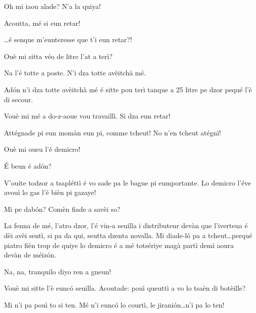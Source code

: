 \begin{drama}
\Pierluigispeaks{} Oh mi iaou alade? N'a la quiya!
 
\Lucianospeaks Acoutta, mé si eun retar!

\Pierluigispeaks \ldots é senque m'eunteresse que t'i eun retar?!


\Lucianospeaks Ouè mi sitta véo de litre l'at a terì?


\Prosperospeaks{} Na l'é totte a poste.  N'i dza totte avèitchà mé. 


\Prosperospeaks Ad\'on n'i dza totte avèitchà mé é sitte pou terì tanque a 25 litre pe dzor pequé l'è di secour.

\Lucianospeaks Vouè mi mé a do-z-aoue vou travaillì. Si dza eun retar! 

\Prosperospeaks Attégnade pi eun momàn eun pi, comme tcheut! No n'en tcheut atégnì!

\Lucianospeaks Ouè mi oueu l'é demicro!

\Prosperospeaks \'E beun é ad\'on?

\Lucianospeaks V'ouite todzor a tsapléttì é vo sade pa le bague pi eumportante. Lo demicro l'éve avouì lo gas l'é bièn pi gazaye!

\Prosperospeaks Mi pe dab\'on? Comèn fiade a savèi so?

\Lucianospeaks La fenna de mé, l'atro dzor, l'é vin-a seuilla i distributeur devàn que l’iverteua é dèi avèi sentì, si pa da qui, seutta dzenta novalla. Mi diade-l\'o pa a tcheut\ldots perqué piatro fièn trop de quiye lo demicro é a mé totsériye magà partì demì aoura devàn de méiz\'on.

\Prosperospeaks Na, na, tranquilo diyo ren a gneun!

\Lucianospeaks {} Vouè mi sitte l'è eunc\'o seuilla.  Acoutade: pouì queuttì a vo lo tsaèn di botèille?

\Prosperospeaks Mi n'i pa pouì to si ten. Mé n'i eunc\'o lo courtì, le jirani\'on\ldots n'i pa lo ten!


\end{drama}
